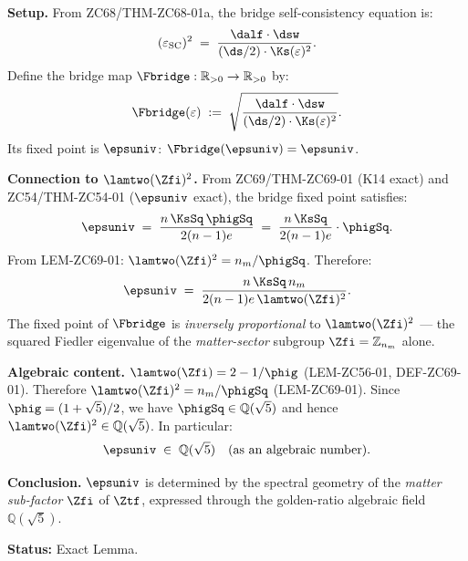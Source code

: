 \documentclass[12pt, a4paper]{article}
\begin{document}
\begin{formalbox}[title={LEM-ZC71-02: $\Fbridge$ Probes
  $\lamtwo(\Zfi)^{2}$ ($R_0$, Exact)}]

\textbf{Setup.}
From ZC68/THM-ZC68-01a, the bridge self-consistency equation is:
\begin{equation}
  (\varepsilon_{\rm SC})^{2}
  \;=\;
  \frac{\dalf\cdot\dsw}{(\ds/2)\cdot\Ks(\varepsilon)^2}.
  \label{eq:bridge-fp-raw}
\end{equation}
Define the bridge map $\Fbridge:\mathbb{R}_{>0}\to\mathbb{R}_{>0}$ by:
\begin{equation}
  \Fbridge(\varepsilon)
  \;:=\;
  \sqrt{\frac{\dalf\cdot\dsw}{(\ds/2)\cdot\Ks(\varepsilon)^2}}.
  \label{eq:Fbridge}
\end{equation}
Its fixed point is $\epsuniv$: $\Fbridge(\epsuniv) = \epsuniv$.

\textbf{Connection to $\lamtwo(\Zfi)^{2}$.}
From ZC69/THM-ZC69-01 (K14 exact) and ZC54/THM-ZC54-01
($\epsuniv$ exact), the bridge fixed point satisfies:
\begin{equation}
  \epsuniv
  \;=\;
  \frac{n\,\KsSq\,\phigSq}{2(n-1)e}
  \;=\;
  \frac{n\,\KsSq}{2(n-1)e}
  \cdot\phigSq.
  \label{eq:eps-univ-exact}
\end{equation}
From LEM-ZC69-01: $\lamtwo(\Zfi)^{2} = n_m/\phigSq$.
Therefore:
\begin{equation}
  \epsuniv
  \;=\;
  \frac{n\,\KsSq\,n_m}{2(n-1)e\,\lamtwo(\Zfi)^{2}}.
  \label{eq:eps-univ-fiedler}
\end{equation}
The fixed point of $\Fbridge$ is \emph{inversely proportional}
to $\lamtwo(\Zfi)^{2}$ --- the squared Fiedler eigenvalue of
the \emph{matter-sector} subgroup $\Zfi = \mathbb{Z}_{n_m}$ alone.

\textbf{Algebraic content.}
$\lamtwo(\Zfi) = 2 - 1/\phig$ (LEM-ZC56-01, DEF-ZC69-01).
Therefore $\lamtwo(\Zfi)^{2} = n_m/\phigSq$ (LEM-ZC69-01).
Since $\phig = (1+\sqrt{5})/2$, we have $\phigSq \in \mathbb{Q}(\sqrt{5})$
and hence $\lamtwo(\Zfi)^{2} \in \mathbb{Q}(\sqrt{5})$.
In particular:
\[
  \epsuniv \;\in\; \mathbb{Q}(\sqrt{5})
  \quad(\text{as an algebraic number}).
\]

\textbf{Conclusion.}
$\epsuniv$ is determined by the spectral geometry of the
\emph{matter sub-factor} $\Zfi$ of $\Ztf$, expressed through
the golden-ratio algebraic field $\mathbb{Q}(\sqrt{5})$.

\textbf{Status:} Exact Lemma.
\end{formalbox}

\end{document}
